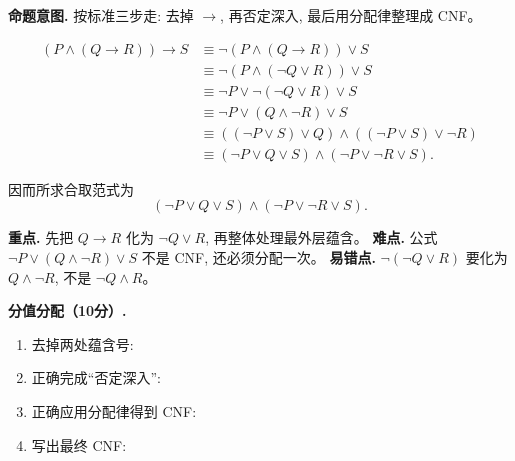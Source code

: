 \documentclass[a4paper, justified]{tufte-handout}
\newenvironment{intention}
  {\par\smallskip\noindent\textbf{命题意图. }\ignorespaces}
  {\par\smallskip}
\begin{document}
\begin{solution}
  \begin{intention}
    按标准三步走: 去掉 $\to$, 再否定深入, 最后用分配律整理成 CNF。
  \end{intention}

  \begin{align*}
    (P \land (Q \to R)) \to S
      &\equiv \lnot (P \land (Q \to R)) \lor S \\
      &\equiv \lnot (P \land (\lnot Q \lor R)) \lor S \\
      &\equiv \lnot P \lor \lnot (\lnot Q \lor R) \lor S \\
      &\equiv \lnot P \lor (Q \land \lnot R) \lor S \\
      &\equiv ((\lnot P \lor S) \lor Q) \land ((\lnot P \lor S) \lor \lnot R) \\
      &\equiv (\lnot P \lor Q \lor S) \land (\lnot P \lor \lnot R \lor S).
  \end{align*}

  因而所求合取范式为
  \[
    (\lnot P \lor Q \lor S) \land (\lnot P \lor \lnot R \lor S).
  \]

  \begin{remark}
    \textbf{重点.} 先把 $Q \to R$ 化为 $\lnot Q \lor R$, 再整体处理最外层蕴含。
    \textbf{难点.} 公式
    $\lnot P \lor (Q \land \lnot R) \lor S$
    不是 CNF, 还必须分配一次。
    \textbf{易错点.} $\lnot(\lnot Q \lor R)$ 要化为 $Q \land \lnot R$, 不是 $\lnot Q \land R$。
  \end{remark}

  \textbf{分值分配（10分）.}
  \begin{enumerate}[(1)]
    \item 去掉两处蕴含号: 
    \item 正确完成“否定深入”: 
    \item 正确应用分配律得到 CNF: 
    \item 写出最终 CNF: 
  \end{enumerate}
\end{solution}
\end{document}
